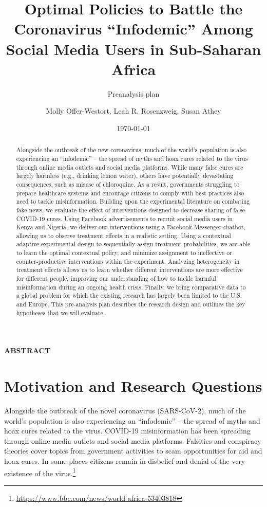 \documentclass[letterpaper, 12pt, parskip=full,]{scrartcl}
\title{Optimal Policies to Battle the Coronavirus ``Infodemic'' Among Social Media Users in Sub-Saharan Africa}
\subtitle{Preanalysis plan}
\author{Molly Offer-Westort, Leah R. Rosenzweig, Susan Athey}
\date{\today}
\begin{document}
%
\normalsize%
\maketitle%
\tableofcontents%
\clearpage%


\centerline{\textbf{ABSTRACT}}
\begin{abstract}
Alongside the outbreak of the new coronavirus, much of the world’s population is also experiencing an “infodemic” -- the spread of myths and hoax cures related to the virus through online media outlets and social media platforms. While many false cures are largely harmless (e.g., drinking lemon water), others have potentially devastating consequences, such as misuse of chloroquine. As a result, governments struggling to prepare healthcare systems and encourage citizens to comply with best practices also need to tackle misinformation. Building upon the experimental literature on combating fake news, we evaluate the effect of interventions designed to decrease sharing of false COVID-19 cures. Using Facebook advertisements to recruit social media users in Kenya and Nigeria, we deliver our interventions using a Facebook Messenger chatbot, allowing us to observe treatment effects in a realistic setting. Using a contextual adaptive experimental design to sequentially assign treatment probabilities, we are able to learn the optimal contextual policy, and minimize assignment to ineffective or counter-productive interventions within the experiment. Analyzing heterogeneity in treatment effects allows us to learn whether different interventions are more effective for different people, improving our understanding of how to tackle harmful misinformation during an ongoing health crisis. Finally, we bring comparative data to a global problem for which the existing research has largely been limited to the U.S. and Europe. This pre-analysis plan describes the research design and outlines the key hypotheses that we will evaluate.
\end{abstract}





\section{Motivation and Research Questions}

Alongside the outbreak of the novel coronavirus (SARS-CoV-2), much of the world's population is also experiencing an ``infodemic'' -- the spread of myths and hoax cures related to the virus. COVID-19 misinformation has been spreading through online media outlets and social media platforms. Falsities and conspiracy theories cover topics from government activities to scam opportunities for aid and hoax cures. In some places citizens remain in disbelief and denial of the very existence of the virus.\footnote{\url{https://www.bbc.com/news/world-africa-53403818}} 
\end{document}
